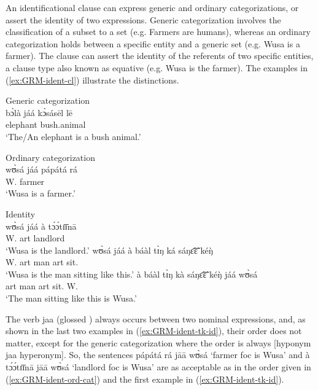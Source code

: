 An identificational clause can express generic and ordinary categorizations, or assert the identity  of two expressions. Generic categorization involves the classification of a subset to a set (e.g. Farmers are humans), whereas an ordinary categorization holds between a specific entity and a generic set  (e.g.  Wusa is a farmer). The clause can assert the identity of the referents of two specific entities, a clause type also known as equative (e.g. Wusa is the farmer). The examples in (\ref{ex:GRM-ident-cl}) illustrate the distinctions. 


\ea\label{ex:GRM-ident-cl}

\ea\label{ex:GRM-ident-gen-cat}{\rm Generic categorization}\\
\gll
 bɔ̀là jáá kɔ̀sásēl lē\\
 elephant {\ident}  bush.animal {\foc}\\
\glt `The/An elephant is a bush animal.'

\ex\label{ex:GRM-ident-ord-cat}{\rm Ordinary categorization}\\
\gll
wʊ̀sá jáá pápátá rá\\
W. {\ident} farmer {\foc}\\
\glt `Wusa is a farmer.'

\ex\label{ex:GRM-ident-tk-id}{\rm Identity}\\

\ea
\gll
wʊ̀sá jáá à tɔ́ɔ́tɪ̄ɪ̄nā\\
W. {\ident} {\sc art} landlord\\
\glt `Wusa is the landlord.'
\ex
\gll
wʊ̀sá jáá  à báàl tɪ̀ŋ ká sáŋɛ̃̄ɛ̃̄ kéŋ̀\\
W. {\ident} {\sc art} man {\sc art} {\egr} sit.{\pfv} {\dxm}\\
\glt `Wusa is the man sitting like this.'
\ex
\gll
à báàl tɪ̀ŋ kà sáŋɛ̃̄ɛ̃̄ kéŋ̀  jáá wʊ̀sá\\
 {\sc art} man {\sc art} {\egr} sit.{\pfv} {\dxm} {\ident}   W.\\
\glt `The man sitting like this is Wusa.'



\z 
\z
 \z

The verb {\sls jaa}  (glossed {\ident}) always  occurs between two nominal  
expressions,  and, as shown in the last two examples in 
(\ref{ex:GRM-ident-tk-id}),  their order  does not matter, except for the 
generic categorization where the order is always [hyponym {\sls jaa} hyperonym].  So,  the sentences {\sls pápátá rá jāā wʊ̀sá} `farmer {\sc foc} 
is Wusa' and {\sls à tɔ́ɔ́tɪ̄ɪ̄nā  jāā  wʊ̀sá} `landlord {\sc foc} is Wusa'   are  as 
acceptable as in 
the 
order given in (\ref{ex:GRM-ident-ord-cat}) and the first example in 
(\ref{ex:GRM-ident-tk-id}). 


